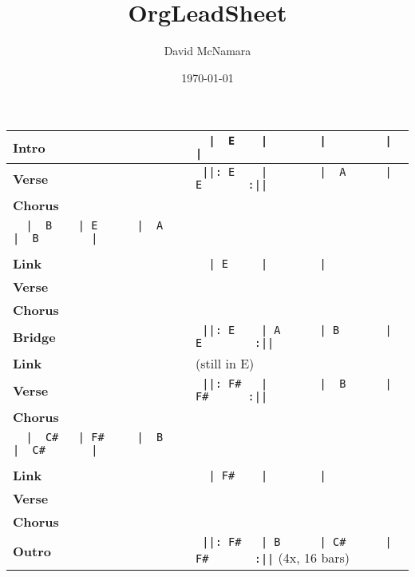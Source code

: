 \documentclass{LeadMemo}
\title{OrgLeadSheet}
\author{David McNamara}
\date{\today}
\begin{document}
\maketitle

\def\arraystretch{2.5}
\begin{tabular}[h]{ p{}  p{}  }
    \huge\textbf{Intro\vfill}         &\large\verb!  |  E    |        |         |           |!\\
    \hline
    \huge\textbf{Verse}  &\large\verb! ||: E    |        |  A      |  E       :||!\\
    \hline
    \huge\textbf{Chorus} &  \begin{minipage}[t]{\textwidth}
    \large\verb!  |  B    | E      |  B      |  E        |!\\ 
    \large\verb!  |  B    | E      |  A      |  B        |!\\
    \end{minipage}
    \\ 
    \hline
    \huge\textbf{Link\vfill}             &\large\verb!  | E     |        |!\\
    \hline
    \huge\textbf{Verse}  &  \\
    \hline
    \huge\textbf{Chorus}  &  \\
    \hline
    \huge\textbf{Bridge}  &\large\verb! ||: E    | A      | B       | E        :||!\\
    \hline
    \huge\textbf{Link\vfill}  &  (still in E) \\
    \hline
    \huge\textbf{Verse}  &\large\verb! ||: F#   |        |  B      |  F#      :||!\\
    \hline
    \huge\textbf{Chorus} &  \begin{minipage}[t]{\textwidth}
    \large\verb!  |  C#   | F#     |  C#     |  F#       |!\\ 
    \large\verb!  |  C#   | F#     |  B      |  C#       |!\\
    \end{minipage}
    \\ 
    \hline
    \huge\textbf{Link\vfill}             &\large\verb!  | F#    |        |!\\
    \hline
    \huge\textbf{Verse} & \\
    \hline
    \huge\textbf{Chorus} & \\
    \hline
    \huge\textbf{Outro}  &\large\verb! ||: F#   | B      | C#      | F#       :||! (4x, 16 bars)\\
 \end{tabular}
\def\arraystretch{1.0}
\end{document}
